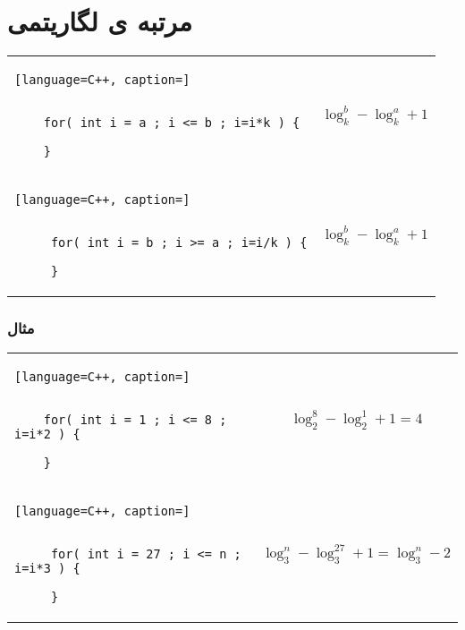 \documentclass[12pt]{book}
\begin{document}
\newpage


\section{مرتبه ی لگاریتمی}





\begin{latin}
\begin{center}
  \bgroup
  \def\arraystretch{1.5}%
  \begin{tabular}{ Y C  }
    \begin{lstlisting}[language=C++, caption=]
    
    
	for( int i = a ; i <= b ; i=i*k ) {
		
	}
	\end{lstlisting}
    &
    \colorbox{gray!10}{\parbox{90pt}{
    $$\log^{b}_{k} - \log^{a}_{k} + 1$$
    }}
     \\ 
     \begin{lstlisting}[language=C++, caption=]
     
     
     for( int i = b ; i >= a ; i=i/k ) {
		
     }
	\end{lstlisting}
    &
    \colorbox{gray!10}{\parbox{90pt}{
    $$\log^{b}_{k} - \log^{a}_{k} + 1$$
    }}
     \\ 
  \end{tabular}
  \egroup
\end{center}
\end{latin}




\subsubsection{مثال}





\begin{latin}
\begin{center}
  \bgroup
  \def\arraystretch{1.5}%
  \begin{tabular}{ Y C  }
    \begin{lstlisting}[language=C++, caption=]
    
    
	for( int i = 1 ; i <= 8 ; i=i*2 ) {
		
	}
	\end{lstlisting}
    &
    \colorbox{gray!10}{\parbox{120pt}{
    $$\log^{8}_{2} - \log^{1}_{2} + 1 = 4$$
    }}
     \\ 
     \begin{lstlisting}[language=C++, caption=]
     
     
     for( int i = 27 ; i <= n ; i=i*3 ) {
		
     }
	\end{lstlisting}
    &
    \colorbox{gray!10}{\parbox{150pt}{
    $$\log^{n}_{3} - \log^{27}_{3} + 1 = \log^{n}_{3} - 2$$
    }}
     \\ 
  \end{tabular}
  \egroup
\end{center}
\end{latin}
\end{document}
